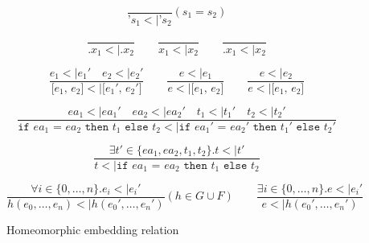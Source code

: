 \documentclass[10pt]{../sigplanconf}
\newcommand{\nfrac}[2]{\frac{\displaystyle{#1}}{\displaystyle{#2}}}
\newcommand{\tagsc}[1]{\tag{\scshape #1}}
\begin{document}
\begin{figure*}\centering
  \begin{equation}
    \nfrac{
    }{
      \texttt{'}s_1 <| \texttt{'}s_2
    } (s_1 = s_2) \tagsc{Atoms}
  \end{equation}

  \begin{equation}
    \nfrac{
    }{
      \texttt{.}x_1 <| \texttt{.}x_2
    }
    \qquad
    \nfrac{
    }{
      x_1 <| x_2
    }
    \qquad
    \nfrac{
    }{
      \texttt{.}x_1 <| x_2
    } \tagsc{Variables}
  \end{equation}

  \begin{equation}
    \nfrac{
      e_1 <| e_1'\quad e_2 <| e_2'
    }{
      \texttt{[$e_1$, $e_2$]} <| \texttt{[$e_1'$, $e_2'$]}
    }
    \qquad
    \nfrac{
      e <| e_1
    }{
      e <| \texttt{[$e_1$, $e_2$]}
    }
    \qquad
    \nfrac{
      e <| e_2
    }{
      e <| \texttt{[$e_1$, $e_2$]}
    }
    \tagsc{Cons}
  \end{equation}

  \begin{equation}
    \nfrac{
      ea_1 <| ea_1' \quad ea_2 <| ea_2' \quad t_1 <| t_1' \quad t_2 <| t_2'
    }{
      \texttt{if $ea_1$ = $ea_2$ then $t_1$ else $t_2$} <| \texttt{if $ea_1'$ = $ea_2'$ then $t_1'$ else $t_2'$}
    } \tagsc{If-A}
  \end{equation}

  \begin{equation}
    \nfrac{
      \exists t' \in \{ea_1, ea_2, t_1, t_2\}. t <| t'
    }{
      t <| \texttt{if $ea_1$ = $ea_2$ then $t_1$ else $t_2$}
    } \tagsc{If-B}
  \end{equation}

\begin{equation}
  \nfrac{
    \forall i \in \{0, \ldots, n\}. e_i <| e_i'
  }{
    h(e_0, \ldots, e_n) <| h(e_0', \ldots, e_n')
  } (h \in G \cup F)
  \qquad
  \nfrac{
    \exists i \in \{0, \ldots, n\}. e <| e_i'
  }{
    e <| h(e_0', \ldots, e_n')
  }
 \tagsc{Call}
\end{equation}

\caption{Homeomorphic embedding relation}
\label{fig:embedding}
\end{figure*}
\end{document}
